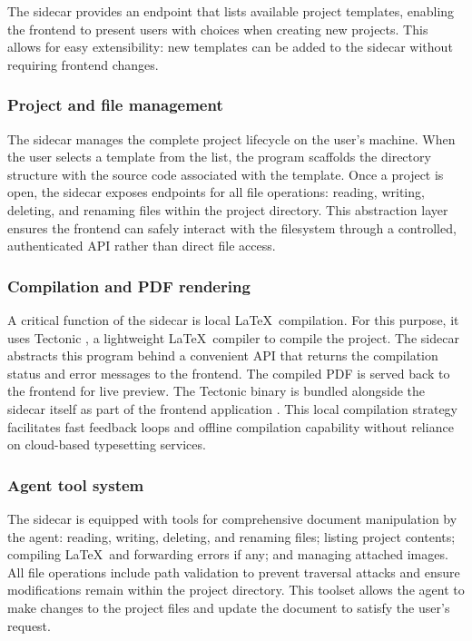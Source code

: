 The sidecar provides an endpoint that lists available project templates, enabling the frontend to present users with choices when creating new projects.
This allows for easy extensibility: new templates can be added to the sidecar without requiring frontend changes.

\subsubsection{Project and file management}

The sidecar manages the complete project lifecycle on the user's machine.
When the user selects a template from the list, the program scaffolds the directory structure with the source code associated with the template.
Once a project is open, the sidecar exposes endpoints for all file operations: reading, writing, deleting, and renaming files within the project directory.
This abstraction layer ensures the frontend can safely interact with the filesystem through a controlled, authenticated API rather than direct file access.

\subsubsection{Compilation and PDF rendering}

A critical function of the sidecar is local \LaTeX\ compilation.
For this purpose, it uses Tectonic \cite{tectonic}, a lightweight \LaTeX\ compiler to compile the project.
The sidecar abstracts this program behind a convenient API that returns the compilation status and error messages to the frontend.
The compiled PDF is served back to the frontend for live preview.
The Tectonic binary is bundled alongside the sidecar itself as part of the frontend application \cite{tauri_sidecar}.
This local compilation strategy facilitates fast feedback loops and offline compilation capability without reliance on cloud-based typesetting services.


\subsubsection{Agent tool system}

The sidecar is equipped with tools for comprehensive document manipulation by the agent: reading, writing, deleting, and renaming files; listing project contents; compiling \LaTeX\ and forwarding errors if any; and managing attached images.
All file operations include path validation to prevent traversal attacks and ensure modifications remain within the project directory.
This toolset allows the agent to make changes to the project files and update the document to satisfy the user's request.

